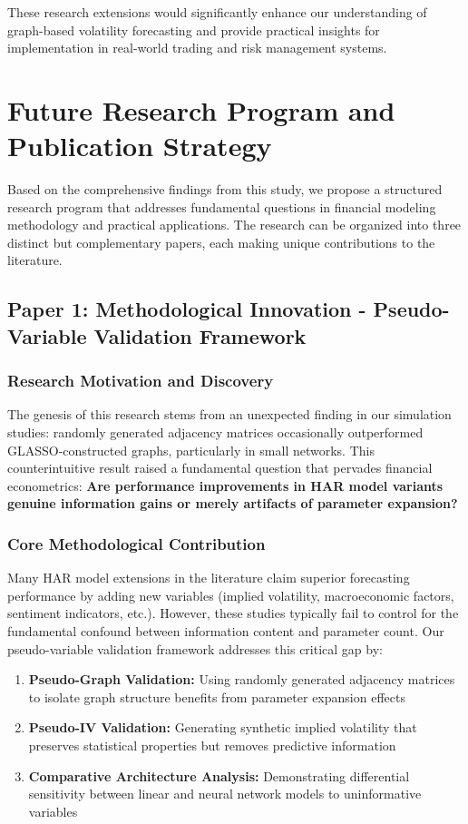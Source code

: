\documentclass[12pt,a4paper]{article}
\begin{document}
These research extensions would significantly enhance our understanding of graph-based volatility forecasting and provide practical insights for implementation in real-world trading and risk management systems.

\section{Future Research Program and Publication Strategy}

Based on the comprehensive findings from this study, we propose a structured research program that addresses fundamental questions in financial modeling methodology and practical applications. The research can be organized into three distinct but complementary papers, each making unique contributions to the literature.

\subsection{Paper 1: Methodological Innovation - Pseudo-Variable Validation Framework}

\subsubsection{Research Motivation and Discovery}

The genesis of this research stems from an unexpected finding in our simulation studies: randomly generated adjacency matrices occasionally outperformed GLASSO-constructed graphs, particularly in small networks. This counterintuitive result raised a fundamental question that pervades financial econometrics: \textbf{Are performance improvements in HAR model variants genuine information gains or merely artifacts of parameter expansion?}

\subsubsection{Core Methodological Contribution}

Many HAR model extensions in the literature claim superior forecasting performance by adding new variables (implied volatility, macroeconomic factors, sentiment indicators, etc.). However, these studies typically fail to control for the fundamental confound between information content and parameter count. Our pseudo-variable validation framework addresses this critical gap by:

\begin{enumerate}
\item \textbf{Pseudo-Graph Validation:} Using randomly generated adjacency matrices to isolate graph structure benefits from parameter expansion effects
\item \textbf{Pseudo-IV Validation:} Generating synthetic implied volatility that preserves statistical properties but removes predictive information
\item \textbf{Comparative Architecture Analysis:} Demonstrating differential sensitivity between linear and neural network models to uninformative variables
\end{enumerate}
\end{document}
